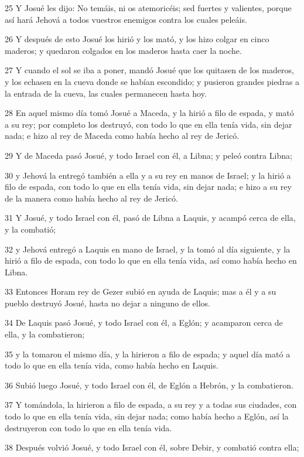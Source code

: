 \par 25 Y Josué les dijo: No temáis, ni os atemoricéis; sed fuertes y valientes, porque así hará Jehová a todos vuestros enemigos contra los cuales peleáis.
\par 26 Y después de esto Josué los hirió y los mató, y los hizo colgar en cinco maderos; y quedaron colgados en los maderos hasta caer la noche.
\par 27 Y cuando el sol se iba a poner, mandó Josué que los quitasen de los maderos, y los echasen en la cueva donde se habían escondido; y pusieron grandes piedras a la entrada de la cueva, las cuales permanecen hasta hoy.
\par 28 En aquel mismo día tomó Josué a Maceda, y la hirió a filo de espada, y mató a su rey; por completo los destruyó, con todo lo que en ella tenía vida, sin dejar nada; e hizo al rey de Maceda como había hecho al rey de Jericó.
\par 29 Y de Maceda pasó Josué, y todo Israel con él, a Libna; y peleó contra Libna;
\par 30 y Jehová la entregó también a ella y a su rey en manos de Israel; y la hirió a filo de espada, con todo lo que en ella tenía vida, sin dejar nada; e hizo a su rey de la manera como había hecho al rey de Jericó.
\par 31 Y Josué, y todo Israel con él, pasó de Libna a Laquis, y acampó cerca de ella, y la combatió;
\par 32 y Jehová entregó a Laquis en mano de Israel, y la tomó al día siguiente, y la hirió a filo de espada, con todo lo que en ella tenía vida, así como había hecho en Libna.
\par 33 Entonces Horam rey de Gezer subió en ayuda de Laquis; mas a él y a su pueblo destruyó Josué, hasta no dejar a ninguno de ellos.
\par 34 De Laquis pasó Josué, y todo Israel con él, a Eglón; y acamparon cerca de ella, y la combatieron;
\par 35 y la tomaron el mismo día, y la hirieron a filo de espada; y aquel día mató a todo lo que en ella tenía vida, como había hecho en Laquis.
\par 36 Subió luego Josué, y todo Israel con él, de Eglón a Hebrón, y la combatieron.
\par 37 Y tomándola, la hirieron a filo de espada, a su rey y a todas sus ciudades, con todo lo que en ella tenía vida, sin dejar nada; como había hecho a Eglón, así la destruyeron con todo lo que en ella tenía vida.
\par 38 Después volvió Josué, y todo Israel con él, sobre Debir, y combatió contra ella;
